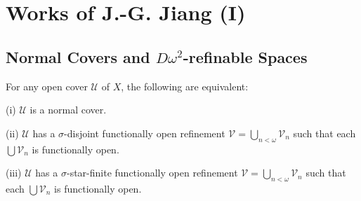 \documentclass[main.tex]{subfiles}
\begin{document}
	
\chapter{Works of J.-G. Jiang (I)} 
	\label{ch5}

\section{Normal Covers and $D\omega^2$-refinable Spaces}
\label{sec:5.1}

{\theorem{\label{th:5.1.1}}
For any open cover $\mathscr{U}$ of $X$, the following are equivalent:
	
\textup{(i)}  $\mathscr{U}$ is a normal cover.

\textup{(ii)} $\mathscr{U}$ has a $\sigma$-disjoint functionally open refinement $\mathscr{V} = \bigcup_{n<\omega} \mathscr{V}_n$ such that each $\bigcup \mathscr{V}_n$ is functionally open.

\textup{(iii)}  $\mathscr{U}$ has a $\sigma$-star-finite functionally open refinement 
$\mathscr{V} = \bigcup_{n<\omega} \mathscr{V}_n$ such that each $\bigcup \mathscr{V}_n$ is functionally open.
}
\end{document}
